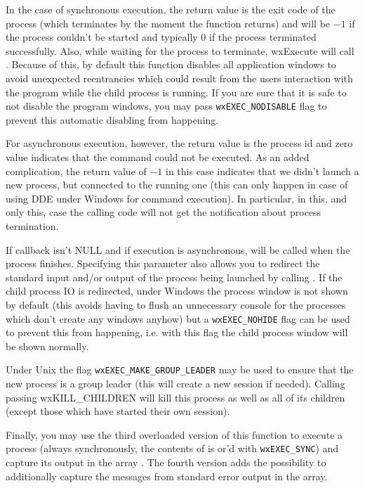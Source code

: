 In the case of synchronous execution, the return value is the exit code of
the process (which terminates by the moment the function returns) and will be
$-1$ if the process couldn't be started and typically 0 if the process
terminated successfully. Also, while waiting for the process to
terminate, wxExecute will call . Because of this, by
default this function disables all application windows to avoid unexpected
reentrancies which could result from the users interaction with the program
while the child process is running. If you are sure that it is safe to not
disable the program windows, you may pass \texttt{wxEXEC\_NODISABLE} flag to
prevent this automatic disabling from happening.

For asynchronous execution, however, the return value is the process id and
zero value indicates that the command could not be executed. As an added
complication, the return value of $-1$ in this case indicates that we didn't
launch a new process, but connected to the running one (this can only happen in
case of using DDE under Windows for command execution). In particular, in this,
and only this, case the calling code will not get the notification about
process termination.

If callback isn't NULL and if execution is asynchronous,
 will be called when
the process finishes. Specifying this parameter also allows you to redirect the
standard input and/or output of the process being launched by calling
. If the child process IO is redirected,
under Windows the process window is not shown by default (this avoids having to
flush an unnecessary console for the processes which don't create any windows
anyhow) but a {\tt wxEXEC\_NOHIDE} flag can be used to prevent this from
happening, i.e. with this flag the child process window will be shown normally.

Under Unix the flag {\tt wxEXEC\_MAKE\_GROUP\_LEADER} may be used to ensure
that the new process is a group leader (this will create a new session if
needed). Calling  passing wxKILL\_CHILDREN will
kill this process as well as all of its children (except those which have
started their own session).

Finally, you may use the third overloaded version of this function to execute
a process (always synchronously, the contents of  is or'd with
\texttt{wxEXEC\_SYNC}) and capture its output in the array . The
fourth version adds the possibility to additionally capture the messages from
standard error output in the  array.

